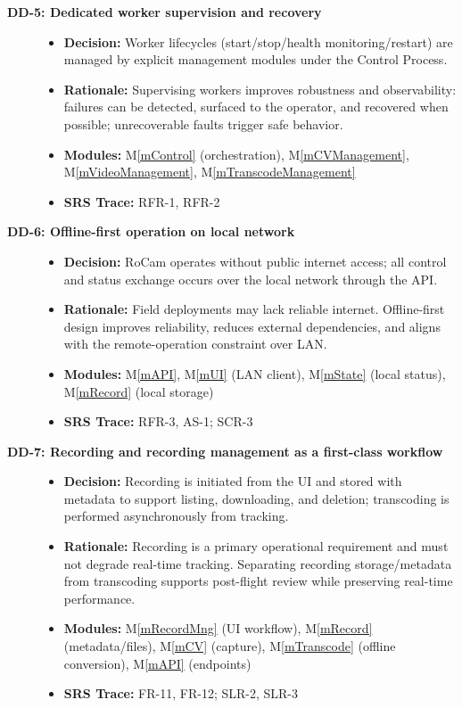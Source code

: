 \documentclass[12pt, titlepage]{article}
\newcommand{\mref}[1]{M\ref{#1}}
\begin{document}
\begin{description}
  \item[\textbf{DD-5: Dedicated worker supervision and recovery}] \leavevmode
        \begin{itemize}
          \item \textbf{Decision:} Worker lifecycles (start/stop/health monitoring/restart) are managed by explicit
                management modules under the Control Process.
          \item \textbf{Rationale:} Supervising workers improves robustness and observability: failures can be detected,
                surfaced to the operator, and recovered when possible; unrecoverable faults trigger safe behavior.
          \item \textbf{Modules:} \mref{mControl} (orchestration), \mref{mCVManagement}, \mref{mVideoManagement}, \mref{mTranscodeManagement}
          \item \textbf{SRS Trace:} RFR-1, RFR-2
        \end{itemize}

  \item[\textbf{DD-6: Offline-first operation on local network}] \leavevmode
        \begin{itemize}
          \item \textbf{Decision:} RoCam operates without public internet access; all control and status exchange
                occurs over the local network through the API.
          \item \textbf{Rationale:} Field deployments may lack reliable internet. Offline-first design improves reliability,
                reduces external dependencies, and aligns with the remote-operation constraint over LAN.
          \item \textbf{Modules:} \mref{mAPI}, \mref{mUI} (LAN client), \mref{mState} (local status), \mref{mRecord} (local storage)
          \item \textbf{SRS Trace:} RFR-3, AS-1; SCR-3
        \end{itemize}

  \item[\textbf{DD-7: Recording and recording management as a first-class workflow}] \leavevmode
        \begin{itemize}
          \item \textbf{Decision:} Recording is initiated from the UI and stored with metadata to support listing,
                downloading, and deletion; transcoding is performed asynchronously from tracking.
          \item \textbf{Rationale:} Recording is a primary operational requirement and must not degrade real-time tracking.
                Separating recording storage/metadata from transcoding supports post-flight review while preserving real-time performance.
          \item \textbf{Modules:} \mref{mRecordMng} (UI workflow), \mref{mRecord} (metadata/files), \mref{mCV} (capture),
                \mref{mTranscode} (offline conversion), \mref{mAPI} (endpoints)
          \item \textbf{SRS Trace:} FR-11, FR-12; SLR-2, SLR-3
        \end{itemize}


\end{description}
\end{document}
